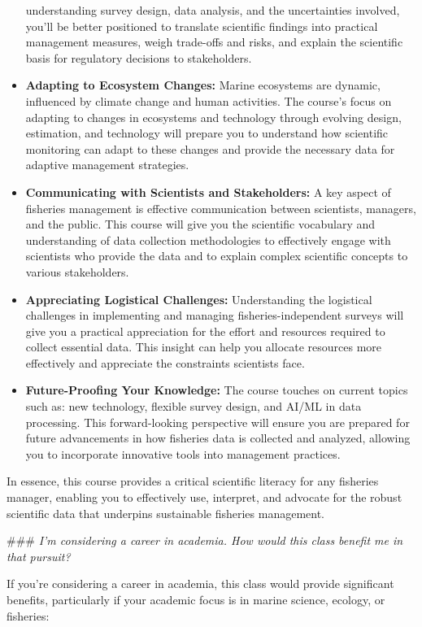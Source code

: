 \documentclass[
  letterpaper,
  oneside,
  open=any]{scrbook}
\begin{document}
\begin{itemize}
  understanding survey design, data analysis, and the uncertainties
  involved, you'll be better positioned to translate scientific findings
  into practical management measures, weigh trade-offs and risks, and
  explain the scientific basis for regulatory decisions to stakeholders.
\item
  \textbf{Adapting to Ecosystem Changes:} Marine ecosystems are dynamic,
  influenced by climate change and human activities. The course's focus
  on adapting to changes in ecosystems and technology through evolving
  design, estimation, and technology will prepare you to understand how
  scientific monitoring can adapt to these changes and provide the
  necessary data for adaptive management strategies.
\item
  \textbf{Communicating with Scientists and Stakeholders:} A key aspect
  of fisheries management is effective communication between scientists,
  managers, and the public. This course will give you the scientific
  vocabulary and understanding of data collection methodologies to
  effectively engage with scientists who provide the data and to explain
  complex scientific concepts to various stakeholders.
\item
  \textbf{Appreciating Logistical Challenges:} Understanding the
  logistical challenges in implementing and managing
  fisheries-independent surveys will give you a practical appreciation
  for the effort and resources required to collect essential data. This
  insight can help you allocate resources more effectively and
  appreciate the constraints scientists face.
\item
  \textbf{Future-Proofing Your Knowledge:} The course touches on current
  topics such as: new technology, flexible survey design, and AI/ML in
  data processing. This forward-looking perspective will ensure you are
  prepared for future advancements in how fisheries data is collected
  and analyzed, allowing you to incorporate innovative tools into
  management practices.
\end{itemize}

In essence, this course provides a critical scientific literacy for any
fisheries manager, enabling you to effectively use, interpret, and
advocate for the robust scientific data that underpins sustainable
fisheries management.

\#\#\# \emph{I'm considering a career in academia. How would this class
benefit me in that pursuit?}

If you're considering a career in academia, this class would provide
significant benefits, particularly if your academic focus is in marine
science, ecology, or fisheries:
\end{document}
